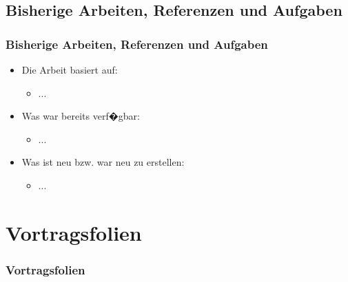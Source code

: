 \documentclass[
	10pt,
	t		%
]{beamer}
\begin{document}
\subsection{Bisherige Arbeiten, Referenzen und Aufgaben}
\begin{frame}
\frametitle{Bisherige Arbeiten, Referenzen und Aufgaben}
\begin{itemize}
\item Die Arbeit basiert auf:
\begin{itemize}
\item ...
\end{itemize}
\item Was war bereits verf�gbar:
\begin{itemize}
\item ...
\end{itemize}
\item Was ist neu bzw. war neu zu erstellen:
\begin{itemize}
\item  ...
\end{itemize}
\end{itemize}

\end{frame}


\section{Vortragsfolien}
\begin{frame}
\frametitle{Vortragsfolien}
\end{frame}
\end{document}

